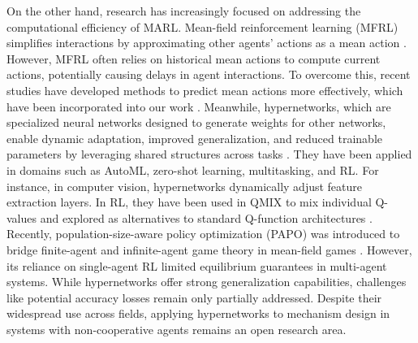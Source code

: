 On the other hand, research has increasingly focused on addressing the computational efficiency of MARL. Mean-field reinforcement learning (MFRL) simplifies interactions by approximating other agents' actions as a mean action \citep{yang2018mean}. However, MFRL often relies on historical mean actions to compute current actions, potentially causing delays in agent interactions. To overcome this, recent studies have developed methods to predict mean actions more effectively, which have been incorporated into our work \citep{zhou2020multi,li2024beyond}. Meanwhile, hypernetworks, which are specialized neural networks designed to generate weights for other networks, enable dynamic adaptation, improved generalization, and reduced trainable parameters by leveraging shared structures across tasks \citep{chauhan2023brief}. They have been applied in domains such as AutoML, zero-shot learning, multitasking, and RL. For instance, in computer vision, hypernetworks dynamically adjust feature extraction layers. In RL, they have been used in QMIX \citep{rashid2020monotonic} to mix individual Q-values and explored as alternatives to standard Q-function architectures \citep{sarafian2021recomposing}. Recently, population-size-aware policy optimization (PAPO) was introduced to bridge finite-agent and infinite-agent game theory in mean-field games \citep{li2023population}. However, its reliance on single-agent RL limited equilibrium guarantees in multi-agent systems. While hypernetworks offer strong generalization capabilities, challenges like potential accuracy losses remain only partially addressed. Despite their widespread use across fields, applying hypernetworks to mechanism design in systems with non-cooperative agents remains an open research area.